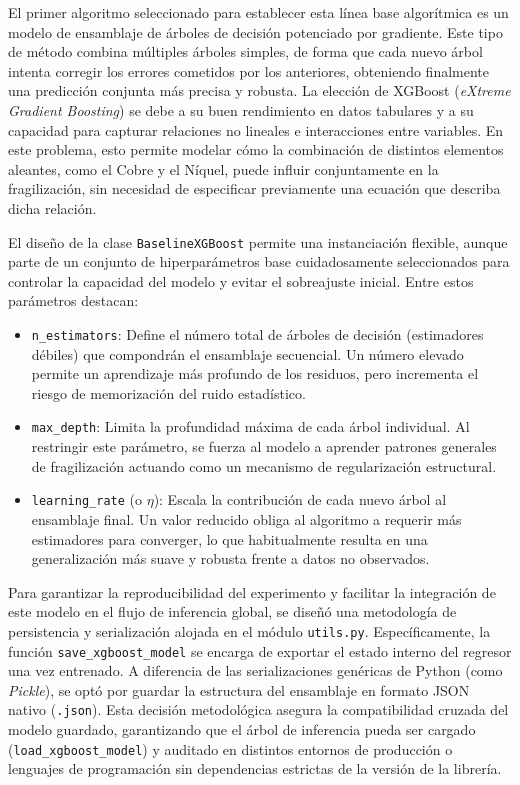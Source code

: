 \documentclass[a4paper, 12pt, twocolumn]{book}
\begin{document}
El primer algoritmo seleccionado para establecer esta línea base algorítmica es un modelo de ensamblaje de árboles de decisión potenciado por gradiente. Este tipo de método combina múltiples árboles simples, de forma que cada nuevo árbol intenta corregir los errores cometidos por los anteriores, obteniendo finalmente una predicción conjunta más precisa y robusta. La elección de XGBoost (\textit{eXtreme Gradient Boosting}) se debe a su buen rendimiento en datos tabulares y a su capacidad para capturar relaciones no lineales e interacciones entre variables. En este problema, esto permite modelar cómo la combinación de distintos elementos aleantes, como el Cobre y el Níquel, puede influir conjuntamente en la fragilización, sin necesidad de especificar previamente una ecuación que describa dicha relación.

El diseño de la clase \texttt{BaselineXGBoost} permite una instanciación flexible, aunque parte de un conjunto de hiperparámetros base cuidadosamente seleccionados para controlar la capacidad del modelo y evitar el sobreajuste inicial. Entre estos parámetros destacan:
\begin{itemize}
    \item \texttt{n\_estimators}: Define el número total de árboles de decisión (estimadores débiles) que compondrán el ensamblaje secuencial. Un número elevado permite un aprendizaje más profundo de los residuos, pero incrementa el riesgo de memorización del ruido estadístico.
    \item \texttt{max\_depth}: Limita la profundidad máxima de cada árbol individual. Al restringir este parámetro, se fuerza al modelo a aprender patrones generales de fragilización actuando como un mecanismo de regularización estructural.
    \item \texttt{learning\_rate} (o $\eta$): Escala la contribución de cada nuevo árbol al ensamblaje final. Un valor reducido obliga al algoritmo a requerir más estimadores para converger, lo que habitualmente resulta en una generalización más suave y robusta frente a datos no observados.
\end{itemize}

Para garantizar la reproducibilidad del experimento y facilitar la integración de este modelo en el flujo de inferencia global, se diseñó una metodología de persistencia y serialización alojada en el módulo \texttt{utils.py}. Específicamente, la función \texttt{save\_xgboost\_model} se encarga de exportar el estado interno del regresor una vez entrenado. A diferencia de las serializaciones genéricas de Python (como \textit{Pickle}), se optó por guardar la estructura del ensamblaje en formato JSON nativo (\texttt{.json}). Esta decisión metodológica asegura la compatibilidad cruzada del modelo guardado, garantizando que el árbol de inferencia pueda ser cargado (\texttt{load\_xgboost\_model}) y auditado en distintos entornos de producción o lenguajes de programación sin dependencias estrictas de la versión de la librería.
\end{document}
